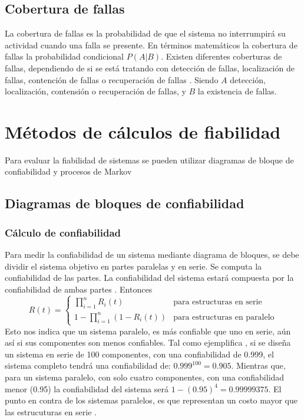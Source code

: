 \subsection{Cobertura de fallas}
La cobertura de fallas es la probabilidad  de que el sistema no interrumpirá su actividad cuando una falla se presente. En términos matemáticos la cobertura
de fallas la probabilidad condicional $P(A|B)$. Existen diferentes coberturas de fallas, dependiendo de si se está tratando con detección de fallas, localización de fallas, contención de
fallas o recuperación de fallas \citep{FTDesign}. Siendo $A$ detección, localización, contensión o recuperación de fallas, y $B$ la existencia de fallas.

\section{Métodos de cálculos de fiabilidad}\label{sec:metodos_calculo_confiabilidad}
Para evaluar la fiabilidad de sistemas se pueden utilizar diagramas de bloque de confiabilidad y procesos de Markov \citep{FTDesign}

\subsection{Diagramas de bloques de confiabilidad}

\subsubsection{Cálculo de confiabilidad}
Para medir la confiabilidad de un sistema mediante diagrama de bloques, se debe dividir el sistema objetivo en  partes paralelas y en serie. Se computa la confiabilidad
de las partes. La confiabilidad del sistema estará compuesta por la confiabilidad de ambas partes \citep{FTDesign}. Entonces
$$R(t) = \left \{
\begin{matrix}
  \prod_{i=1}^{n} R_{i}(t) & \text{para estructuras en serie}\\
  1 - \prod_{i=1}^{n}(1-R_{i}(t)) & \text{para estructuras en paralelo}
\end{matrix} $$
Esto nos indica que un sistema paralelo, es más confiable que uno en serie, aún así si sus componentes son menos confiables. Tal como ejemplifica \cite{FTDesign}, si se diseña un sistema en serie de 100 componentes, con una confiabilidad de 0.999, el sistema completo tendrá una confiabilidad de:
$0.999^{100} = 0.905$. Mientras que, para un sistema paralelo, con solo cuatro componentes, con una confiabilidad menor (0.95) la confiabilidad del sistema
será $1-(0.95)^4 = 0.99999375$. El punto en contra de los sistemas paralelos, es que representan un costo mayor que las estrucuturas en serie \citep{FTDesign}.

